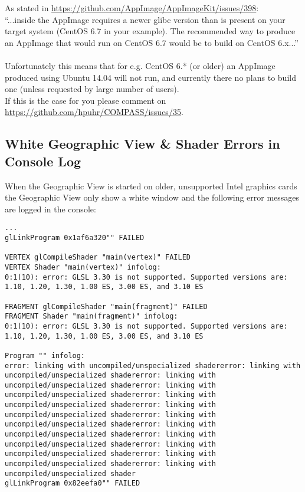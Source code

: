 As stated in \url{https://github.com/AppImage/AppImageKit/issues/398}: \\

``...inside the AppImage requires a newer glibc version than is present on your target system (CentOS 6.7 in your example). The recommended way to produce an AppImage that would run on CentOS 6.7 would be to build on CentOS 6.x...''\\\\

Unfortunately this means that for e.g. CentOS 6.* (or older) an AppImage produced using Ubuntu 14.04 will not run, and currently there no plans to build one (unless requested by large number of users).\\

If this is the case for you please comment on \url{https://github.com/hpuhr/COMPASS/issues/35}.


\subsection{White Geographic View \& Shader Errors in Console Log}
\label{ref:issue_shaders}

When the Geographic View is started on older, unsupported Intel graphics cards the Geographic View only show a white window and the following error messages are logged in the console:

\begin{lstlisting}
...
glLinkProgram 0x1af6a320"" FAILED

VERTEX glCompileShader "main(vertex)" FAILED
VERTEX Shader "main(vertex)" infolog:
0:1(10): error: GLSL 3.30 is not supported. Supported versions are: 1.10, 1.20, 1.30, 1.00 ES, 3.00 ES, and 3.10 ES

FRAGMENT glCompileShader "main(fragment)" FAILED
FRAGMENT Shader "main(fragment)" infolog:
0:1(10): error: GLSL 3.30 is not supported. Supported versions are: 1.10, 1.20, 1.30, 1.00 ES, 3.00 ES, and 3.10 ES

Program "" infolog:
error: linking with uncompiled/unspecialized shadererror: linking with uncompiled/unspecialized shadererror: linking with uncompiled/unspecialized shadererror: linking with uncompiled/unspecialized shadererror: linking with uncompiled/unspecialized shadererror: linking with uncompiled/unspecialized shadererror: linking with uncompiled/unspecialized shadererror: linking with uncompiled/unspecialized shadererror: linking with uncompiled/unspecialized shadererror: linking with uncompiled/unspecialized shadererror: linking with uncompiled/unspecialized shadererror: linking with uncompiled/unspecialized shader
glLinkProgram 0x82eefa0"" FAILED
\end{lstlisting}
\ \\

